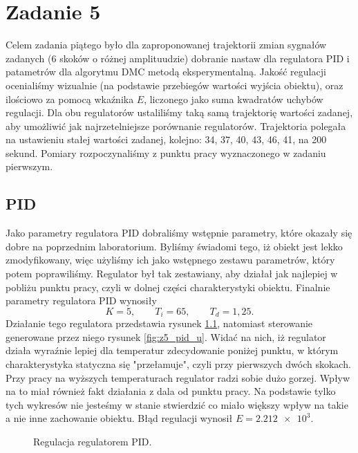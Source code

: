 \chapter{Zadanie 5}
Celem zadania piątego było dla zaproponowanej trajektorii zmian sygnałów zadanych (6 skoków o różnej amplituudzie)
dobranie nastaw dla regulatora PID i patametrów dla algorytmu DMC metodą eksperymentalną.
Jakość regulacji ocenialiśmy wizualnie (na podstawie przebiegów wartości wyjścia obiektu), oraz
ilościowo za pomocą wkaźnika $E$, liczonego jako suma kwadratów uchybów regulacji.
Dla obu regulatorów ustaliliśmy taką samą trajektorię wartości zadanej, aby umożliwić
jak najrzetelniejsze porównanie regulatorów. Trajektoria polegała na ustawieniu
stałej wartości zadanej, kolejno: 34, 37, 40, 43, 46, 41, na 200 sekund.
Pomiary rozpoczynaliśmy z punktu pracy wyznaczonego w zadaniu pierwszym.
\section{PID}
Jako parametry regulatora PID dobraliśmy wstępnie parametry, które okazały się
dobre na poprzednim laboratorium. Byliśmy świadomi tego, iż obiekt jest lekko
zmodyfikowany, więc użyliśmy ich jako wstępnego zestawu parametrów, który potem
poprawiliśmy. Regulator był tak zestawiany, aby działał jak najlepiej w pobliżu punktu pracy,
czyli w dolnej części charakterystyki obiektu.
Finalnie parametry regulatora PID wynosiły
\begin{equation}
  K = 5, \qquad T_i = 65, \qquad T_d = 1,25.
\end{equation}
Działanie tego regulatora przedstawia rysunek \ref{fig:z5_pid}, natomiast sterowanie
generowane przez niego rysunek \ref{fig:z5_pid_u}. Widać na nich, iż regulator działa
wyraźnie lepiej dla temperatur zdecydowanie poniżej punktu, w którym charakterystyka
statyczna się "przełamuje", czyli przy pierwszych dwóch skokach. Przy pracy na wyższych
temperaturach regulator radzi sobie dużo gorzej. Wpływ na to miał również fakt
działania z dala od punktu pracy. Na podstawie tylko tych wykresów nie jesteśmy
w stanie stwierdzić co miało większy wpływ na takie a nie inne zachowanie obiektu. Błąd regulacji wynosił $E=\num{2,212e+3}$.

\begin{figure}[tb]
\centering
{}
\caption{Regulacja regulatorem PID.}
\label{fig:z5_pid}
\end{figure}

